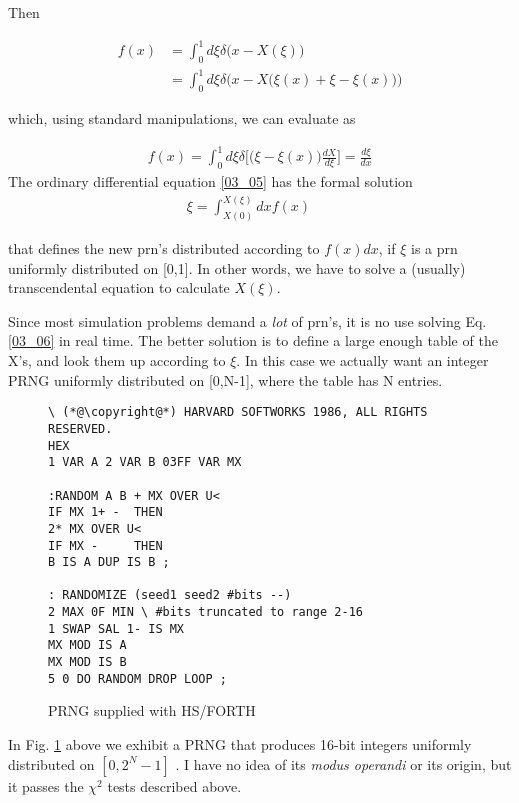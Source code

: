 Then

\begin{align}
    f(x) &= \int_{0}^{1}d\xi\delta \Big(x-X(\xi)\Big)\nonumber \\
    &= \int_{0}^{1}d\xi\delta \Big(x-X\Big(\xi(x)+\xi-\xi(x)\Big)\Big)
\end{align}

which, using standard manipulations, we can evaluate as

\begin{eqnarray} 
    f(x)=\int_{0}^{1}d\xi\delta \Big[\Big(\xi-\xi(x)\Big)\frac{dX}{d\xi}\Big]=\frac{d\xi}{dx} \label{03_05}
\end{eqnarray} 
The ordinary differential equation \ref{03_05} has the formal solution
\begin{eqnarray} 
    \xi=\int_{X(0)}^{X(\xi)}dx f(x) \label{03_06} &&
\end{eqnarray} 

that defines the new prn's distributed according to $f(x)dx$, if $\xi$ is a
prn uniformly distributed on [0,1]. In other words, we have to
solve a (usually) transcendental equation to calculate $X(\xi)$.

Since most simulation problems demand a \textit{lot} of prn's, it is no use
solving Eq. \ref{03_06} in real time. The better solution is to define a large
enough table of the X's, and look them up according to $\xi$. In this
case we actually want an integer PRNG uniformly distributed on
[0,N-1], where the table has N entries.

\begin{figure}[H]
    \label{fig:03_03}
    \begin{mdframed}
        \begin{lstlisting}
\ (*@\copyright@*) HARVARD SOFTWORKS 1986, ALL RIGHTS RESERVED.
HEX
1 VAR A 2 VAR B 03FF VAR MX

:RANDOM A B + MX OVER U<
IF MX 1+ -  THEN
2* MX OVER U<
IF MX -     THEN
B IS A DUP IS B ;

: RANDOMIZE (seed1 seed2 #bits --)
2 MAX 0F MIN \ #bits truncated to range 2-16
1 SWAP SAL 1- IS MX
MX MOD IS A
MX MOD IS B
5 0 DO RANDOM DROP LOOP ;
        \end{lstlisting}
    \end{mdframed}
    \caption{PRNG supplied with HS/FORTH}
\end{figure}

In Fig. \ref{fig:03_03}  above we exhibit a PRNG that produces 16-bit integers
uniformly distributed on $[0, 2^N-1]$ . I have no idea of its \textit{modus
operandi} or its origin, but it passes the $\chi^2$ tests described above.

